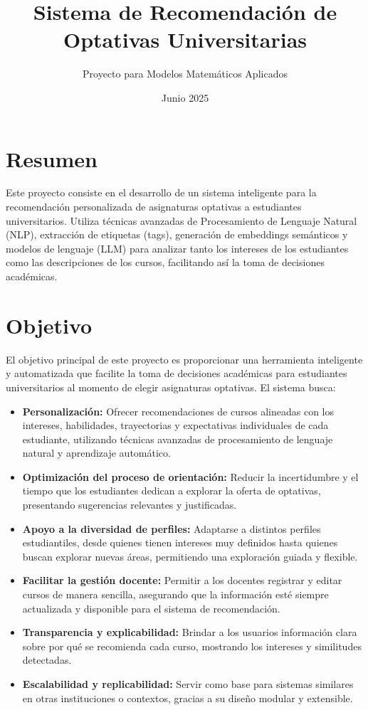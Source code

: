 \documentclass[12pt]{article}
\title{Sistema de Recomendación de Optativas Universitarias}
\author{Proyecto para Modelos Matemáticos Aplicados}
\date{Junio 2025}
\begin{document}
\maketitle

\section*{Resumen}
Este proyecto consiste en el desarrollo de un sistema inteligente para la recomendación personalizada de asignaturas optativas a estudiantes universitarios. Utiliza técnicas avanzadas de Procesamiento de Lenguaje Natural (NLP), extracción de etiquetas (tags), generación de embeddings semánticos y modelos de lenguaje (LLM) para analizar tanto los intereses de los estudiantes como las descripciones de los cursos, facilitando así la toma de decisiones académicas.

\section{Objetivo}
El objetivo principal de este proyecto es proporcionar una herramienta inteligente y automatizada que facilite la toma de decisiones académicas para estudiantes universitarios al momento de elegir asignaturas optativas. El sistema busca:

\begin{itemize}
    \item \textbf{Personalización:} Ofrecer recomendaciones de cursos alineadas con los intereses, habilidades, trayectorias y expectativas individuales de cada estudiante, utilizando técnicas avanzadas de procesamiento de lenguaje natural y aprendizaje automático.
    \item \textbf{Optimización del proceso de orientación:} Reducir la incertidumbre y el tiempo que los estudiantes dedican a explorar la oferta de optativas, presentando sugerencias relevantes y justificadas.
    \item \textbf{Apoyo a la diversidad de perfiles:} Adaptarse a distintos perfiles estudiantiles, desde quienes tienen intereses muy definidos hasta quienes buscan explorar nuevas áreas, permitiendo una exploración guiada y flexible.
    \item \textbf{Facilitar la gestión docente:} Permitir a los docentes registrar y editar cursos de manera sencilla, asegurando que la información esté siempre actualizada y disponible para el sistema de recomendación.
    \item \textbf{Transparencia y explicabilidad:} Brindar a los usuarios información clara sobre por qué se recomienda cada curso, mostrando los intereses y similitudes detectadas.
    \item \textbf{Escalabilidad y replicabilidad:} Servir como base para sistemas similares en otras instituciones o contextos, gracias a su diseño modular y extensible.
\end{itemize}
\end{document}
